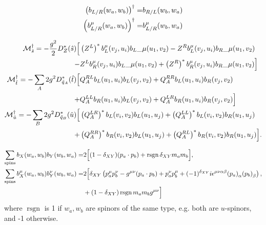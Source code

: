 \documentclass[../main.tex]{subfiles}
\begin{document}
\begin{temporary}
	\begin{subequations}
		\begin{align}
			\left(b_{L/R}(w_a, w_b)\right)^\dagger =     & b_{R/L}(w_b, w_a)     \\
			\left(b_{L/R}^\mu(w_a, w_b)\right)^\dagger = & b_{L/R}^\mu(w_b, w_a)
		\end{align}
	\end{subequations}

	\begin{subequations}
		\begin{align}
			\nonumber
			\mathcal{M}^\dagger_{\hat{s}} = -\frac{g^2}{2} D_Z^\ast(\hat{s}) \Big[           & \left(Z^L\right)^\ast b_L^\mu(v_j, u_i){b_L}\_{\mu}(u_1, v_2) - Z^R b_L^\mu(v_j, u_i){b_R}\_{\mu}(u_1, v_2)         \\
			-                                                                       & Z^L b_R^\mu(v_j, u_i){b_L}\_{\mu}(u_1, v_2) + \left(Z^R\right)^\ast b_R^\mu(v_j, u_i){b_R}\_{\mu}(u_1, v_2) \Big]   \\
			\nonumber
			\mathcal{M}^\dagger_{\hat{t}} = -\sum_A 2g^2 D^\ast_{\tilde{q}_A}(\hat{t}) \Big[ & Q_A^{RL} b_L(u_1, u_i) b_L(v_j, v_2) +  Q_A^{RR} b_L(u_1, u_i) b_R(v_j, v_2)                                     \\
			+                                                                       & Q_A^{LL} b_R(u_1, u_i) b_L(v_j, v_2) + Q_A^{LR} b_R(u_1, u_i) b_R(v_j, v_2) \Big]                                \\
			\nonumber
			\mathcal{M}^\dagger_{\hat{u}} = -\sum_B 2g^2 D^\ast_{\tilde{q}_B}(\hat{u}) \Big[ & \left(Q_A^{LR}\right)^\ast b_L(v_i, v_2) b_L(u_1, u_j) + \left(Q_A^{LL}\right)^\ast b_L(v_i, v_2) b_R(u_1, u_j)        \\
			+                                                                       & \left(Q_A^{RR}\right)^\ast b_R(v_i, v_2) b_L(u_1, u_j) + \left(Q_A^{RL}\right)^\ast b_R(v_i, v_2) b_R(u_1, u_j) \Big].
		\end{align}
	\end{subequations}

	\begin{align}
		\sum_{\text{spins}} b_X(w_a, w_b) b_Y(w_b, w_a) =         & 2 \Big[ (1-\delta_{XY}) (p_a \cdot p_b) + \operatorname{rsgn} \delta_{XY} m_a m_b \Big],                                                                                               \\
		\nonumber
		\sum_{\text{spins}} b_X^\mu(w_a, w_b) b_Y^\nu(w_b, w_a) = & 2\Big[ \delta_{XY}\pclosed{p_a^\mu p_b^\nu - \g (p_a \cdot p_b) + p_a^\nu p_b^\mu + (-1)^{\delta_{XY}} i \epsilon^{\mu\nu\alpha\beta} \tensor{(p_a)}{_\alpha} \tensor{(p_b)}{_\beta}}, \\
		                                                          & + (1-\delta_{XY})\operatorname{rsgn} m_a m_b \g \Big]
	\end{align}
	where \(\operatorname{rsgn}\) is 1 if \(w_a, w_b\) are spinors of the same type, e.g. both are \(u\)-spinors, and -1 otherwise.
\end{temporary}
\end{document}
